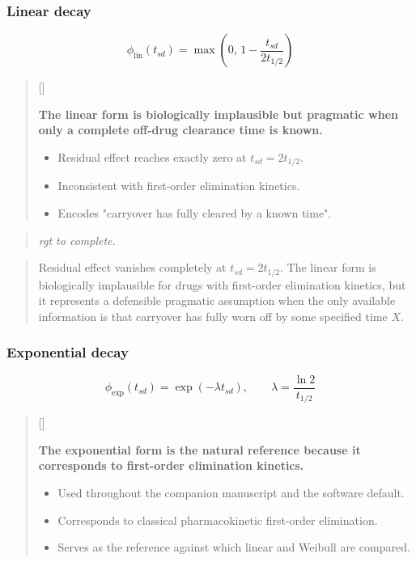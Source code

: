 \documentclass[
  11pt,
]{article}
\newcounter{pgraph}
\newenvironment{bullets}{%
  \stepcounter{pgraph}%
  \begin{quote}\small\sffamily\color[gray]{0.30}%
  {\normalfont\scriptsize\color[gray]{0.58}[\thepgraph]\enspace}}{%
  \end{quote}}
\newenvironment{rgt}{%
  \begin{quote}\small\itshape\color[RGB]{20,60,160}}{%
  \end{quote}}
\newenvironment{orig}{%
  \begin{quote}\normalsize\color[gray]{0.55}}{%
  \end{quote}}
\begin{document}
\subsubsection{Linear decay}\label{linear-decay}

\[
\phi_{\text{lin}}(t_{sd}) =
  \max\left(0,\, 1 - \frac{t_{sd}}{2 t_{1/2}}\right)
\]

\begin{bullets}

\textbf{The linear form is biologically implausible but pragmatic
when only a complete off-drug clearance time is known.}

\begin{itemize}\setlength{\itemsep}{2pt}\setlength{\parskip}{0pt}
\item Residual effect reaches exactly zero at $t_{sd} = 2 t_{1/2}$.
\item Inconsistent with first-order elimination kinetics.
\item Encodes "carryover has fully cleared by a known time".
\end{itemize}

\end{bullets}

\begin{rgt}
rgt to complete.

\end{rgt}

\begin{orig}
Residual effect vanishes completely at \(t_{sd} = 2 t_{1/2}\).
The linear form is biologically implausible for drugs with
first-order elimination kinetics, but it represents a defensible
pragmatic assumption when the only available information is that
carryover has fully worn off by some specified time \(X\).

\end{orig}

\subsubsection{Exponential decay}\label{exponential-decay}

\[
\phi_{\text{exp}}(t_{sd}) =
  \exp\left(-\lambda t_{sd}\right), \qquad
  \lambda = \frac{\ln 2}{t_{1/2}}
\]

\begin{bullets}

\textbf{The exponential form is the natural reference because it
corresponds to first-order elimination kinetics.}

\begin{itemize}\setlength{\itemsep}{2pt}\setlength{\parskip}{0pt}
\item Used throughout the companion manuscript and the software
default.
\item Corresponds to classical pharmacokinetic first-order
elimination.
\item Serves as the reference against which linear and Weibull are
compared.
\end{itemize}

\end{bullets}
\end{document}
